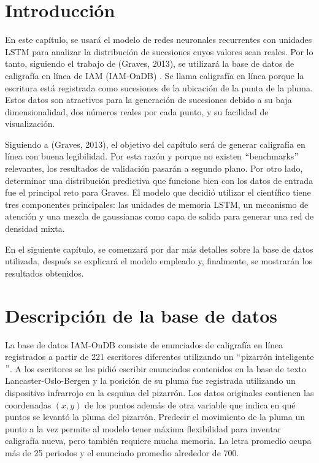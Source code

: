 \section{Introducción}
En este capítulo, se usará el modelo de redes neuronales recurrentes con unidades LSTM para analizar la distribución de sucesiones cuyos valores sean reales. Por lo tanto, siguiendo el trabajo de (Graves, 2013), se utilizará la base de datos de caligrafía en línea de IAM (IAM-OnDB) \cite{handwriting}. 
Se llama caligrafía en línea porque la escritura está registrada como sucesiones de la ubicación de la punta de la pluma. Estos datos son atractivos para la generación de sucesiones debido a su baja dimensionalidad, dos números reales por cada punto, y su facilidad de visualización. 
\cite{handwriting}
\cite{DBLP:journals/corr/Graves13}


\vspace{1em}

Siguiendo a (Graves, 2013), el objetivo del capítulo será de generar caligrafía en línea con buena legibilidad. Por esta razón y porque no existen $``$benchmarks$"$ relevantes, los resultados de validación pasarán a segundo plano. Por otro lado, determinar una distribución predictiva que funcione bien con los datos de entrada fue el principal reto para Graves. El modelo que decidió utilizar el científico tiene tres componentes principales: las unidades de memoria LSTM, un mecanismo de atención y una mezcla de gaussianas como capa de salida para generar una red de densidad mixta. 

\vspace{1em}

En el siguiente capítulo, se comenzará por dar más detalles sobre la base de datos utilizada, después se explicará el modelo empleado y, finalmente, se mostrarán los resultados obtenidos.


\section{Descripción de la base de datos}
La base de datos IAM-OnDB consiste de enunciados de caligrafía en línea registrados a partir de 221 escritores diferentes utilizando un $``$pizarrón inteligente$"$. A los escritores se les pidió escribir enunciados contenidos en la base de texto Lancaster-Oslo-Bergen y la posición de su pluma fue registrada utilizando un dispositivo infrarrojo en la esquina del pizarrón. Los datos originales contienen las coordenadas $(x,y)$ de los puntos además de otra variable que indica en qué puntos se levantó la pluma del pizarrón. Predecir el movimiento de la pluma un punto a la vez permite al modelo tener máxima flexibilidad para inventar caligrafía nueva, pero también requiere mucha memoria. La letra promedio ocupa más de 25 periodos y el enunciado promedio alrededor de 700.
\cite{DBLP:journals/corr/Graves13}

